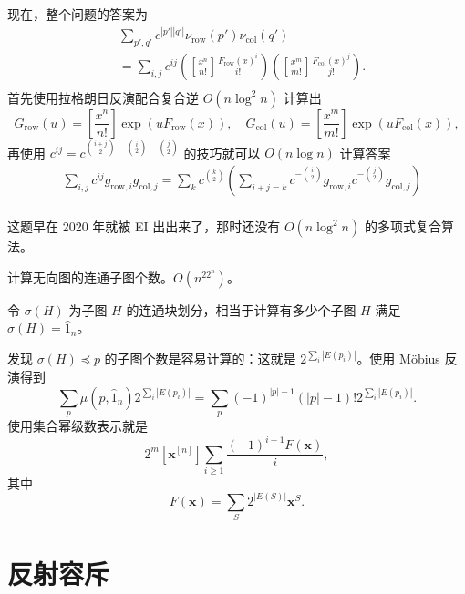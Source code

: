 \begin{solution}
    现在，整个问题的答案为
    $$
    \begin{aligned}
    &\sum_{p',q'}c^{|p'||q'|}\nu_{\mathrm{row}}(p')\nu_{\mathrm{col}}(q')\\
    &=\sum_{i,j}c^{ij}\left(\left[\frac{x^n}{n!}\right]\frac{F_{\mathrm{row}}(x)^i}{i!}\right)\left(\left[\frac{x^m}{m!}\right]\frac{F_{\mathrm{col}}(x)^j}{j!}\right).\\
    \end{aligned}
    $$
    首先使用拉格朗日反演配合复合逆 $O(n\log^2 n)$ 计算出
    $$
    G_{\mathrm{row}}(u)=\left[\frac{x^n}{n!}\right]\exp\left(uF_{\mathrm{row}}(x)\right),\quad G_{\mathrm{col}}(u)=\left[\frac{x^m}{m!}\right]\exp\left(uF_{\mathrm{col}}(x)\right),
    $$
    再使用 $c^{ij}=c^{\binom{i+j}{2}-\binom{i}{2}-\binom{j}{2}}$ 的技巧就可以 $O(n\log n)$ 计算答案
    $$
    \begin{aligned}
    &\sum_{i,j}c^{ij}g_{\mathrm{row},i}g_{\mathrm{col},j}=\sum_k c^{\binom{k}{2}}\left(\sum_{i+j=k} c^{-\binom{i}{2}}g_{\mathrm{row},i}c^{-\binom{j}{2}}g_{\mathrm{col},j}\right)\\
    \end{aligned}
    $$
\end{solution}
\begin{remark}
    这题早在 2020 年就被 EI 出出来了，那时还没有 $O(n\log^2 n)$ 的多项式复合算法。
\end{remark}

\begin{example}[连通子图计数]
    计算无向图的连通子图个数。$O(n^22^n)$。
\end{example}
\begin{solution}
    令 $\sigma(H)$ 为子图 $H$ 的连通块划分，相当于计算有多少个子图 $H$ 满足 $\sigma(H)=\hat 1_n$。

    发现 $\sigma(H)\preceq p$ 的子图个数是容易计算的：这就是 $2^{\sum_i |E(p_i)|}$。使用 M{\"o}bius 反演得到
    $$
    \sum_{p}\mu(p,\hat 1_n)2^{\sum_i |E(p_i)|}=\sum_p (-1)^{|p|-1}(|p|-1)!2^{\sum_i |E(p_i)|}.
    $$
    使用集合幂级数表示就是
    $$
    2^m[\mathbf x^{[n]}]\sum_{i\ge 1}\frac{(-1)^{i-1}F(\mathbf x)}{i},
    $$
    其中
    $$
    F(\mathbf x)=\sum_S 2^{|E(S)|}\mathbf x^S.
    $$
\end{solution}

\section{反射容斥}


